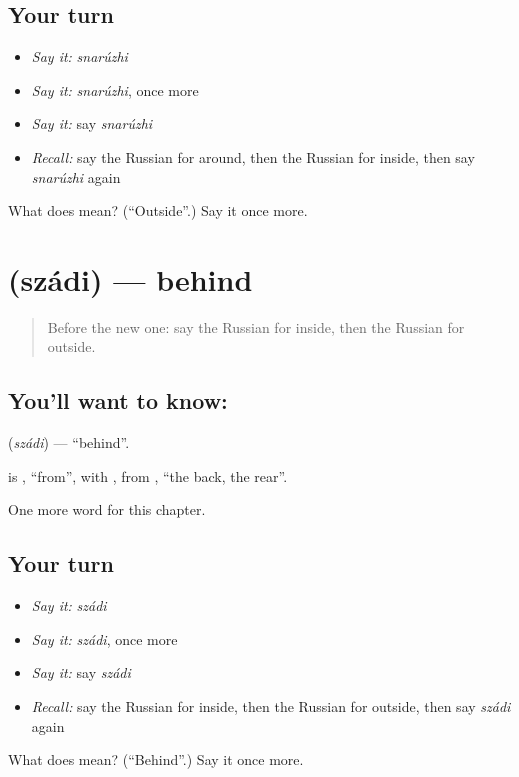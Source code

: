 \subsection*{Your turn}
\begin{itemize}
\raggedright
  \item \emph{Say it:} \emph{snarúzhi}
  \item \emph{Say it:} \emph{snarúzhi}, once more
  \item \emph{Say it:} say \emph{snarúzhi}
  \item \emph{Recall:} say the Russian for around, then the Russian for inside, then say \emph{snarúzhi} again
\end{itemize}

\begin{tcolorbox}[breakable,colback=teal!4,colframe=teal!35!black,title={Before you move on}]
What does  mean? (\textquotedblleft{}Outside\textquotedblright{}.) Say it once more.
\end{tcolorbox}
\section[\texorpdfstring{\ru{сзади} (szádi)}{сзади (szádi)}]{ (szádi) — behind}

\label{lesson:RU-C152-szadi}



\begin{quote}
Before the new one: say the Russian for inside, then the Russian for outside.
\end{quote}

\subsection*{You'll want to know: }
\textbf{} (\emph{szádi}) — \textquotedblleft{}behind\textquotedblright{}.

\begin{cousinweb}
\textbf{} is \emph{}, \textquotedblleft{}from\textquotedblright{}, with \emph{}, from \emph{}, \textquotedblleft{}the back, the rear\textquotedblright{}.
\end{cousinweb}

\begin{grammarlens}[title={What you've built}]
One more word for this chapter.
\end{grammarlens}

\subsection*{Your turn}
\begin{itemize}
\raggedright
  \item \emph{Say it:} \emph{szádi}
  \item \emph{Say it:} \emph{szádi}, once more
  \item \emph{Say it:} say \emph{szádi}
  \item \emph{Recall:} say the Russian for inside, then the Russian for outside, then say \emph{szádi} again
\end{itemize}

\begin{tcolorbox}[breakable,colback=teal!4,colframe=teal!35!black,title={Before you move on}]
What does  mean? (\textquotedblleft{}Behind\textquotedblright{}.) Say it once more.
\end{tcolorbox}
